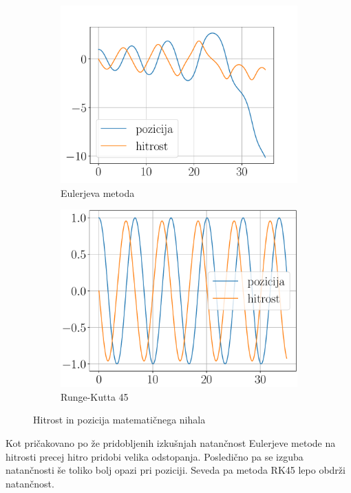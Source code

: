 \documentclass{article}
\begin{document}
\begin{figure}[H]
    \centering
    \begin{subfigure}[b]{0.49\textwidth}
		\centering
		\includegraphics[width=\linewidth]{euler.pdf}
		\caption{Eulerjeva metoda}
    \end{subfigure}
    \hfill
    \begin{subfigure}[b]{0.49\textwidth}
        \centering
        \includegraphics[width=\linewidth]{rk45.pdf}
        \caption{Runge-Kutta 45}
    \end{subfigure}
	\caption{Hitrost in pozicija matematičnega nihala}
\end{figure}
Kot pričakovano po že pridobljenih izkušnjah natančnost Eulerjeve metode na hitrosti precej hitro pridobi velika odstopanja. Posledično pa se izguba natančnosti še toliko bolj opazi pri poziciji. Seveda pa metoda RK45 lepo obdrži natančnost. 
\end{document}
